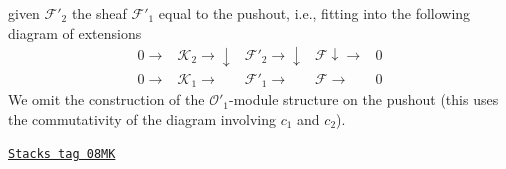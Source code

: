 \begin{remark}
given $\mathcal{F}'_2$ the sheaf $\mathcal{F}'_1$ equal to the
pushout, i.e., fitting into the following diagram of extensions
$$
\begin{array}{ccccc}0 \longrightarrow & \mathcal{K}_2 \longrightarrow\downarrow & \mathcal{F}'_2 \longrightarrow\downarrow & \mathcal{F} \downarrow\longrightarrow & 0 \\ 0 \longrightarrow & \mathcal{K}_1 \longrightarrow & \mathcal{F}'_1 \longrightarrow & \mathcal{F} \longrightarrow & 0\end{array}
$$
We omit the construction of the $\mathcal{O}'_1$-module structure
on the pushout (this uses the commutativity of the diagram
involving $c_1$ and $c_2$).
\end{remark}

\begin{remark}
\label{defos-remark-trivial-extension-functorial-ringed-topoi}
\href{https://stacks.math.columbia.edu/tag/08MK}{\texttt{Stacks tag 08MK}}


\end{remark}

